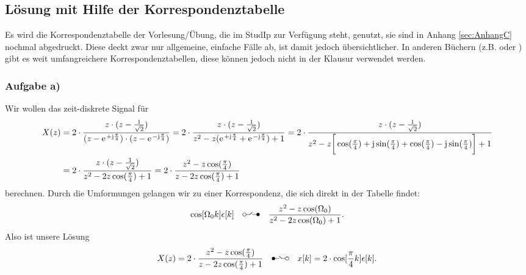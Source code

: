 \documentclass[11pt,a4paper,DIV=12]{scrartcl}
\renewcommand{\ztransf}{\mbox{\setlength{\unitlength}{0.1em}%
                            \begin{picture}(20,10)%
                              \put(2,3){\circle{4}}%
                              \put(4,3){\line(1,0){4.75}}%
                              \multiput(8.625,3.15)(0.25,0.25){11}{%
                                \makebox(0,0){\rmfamily\tiny .}}%
                              \put(17,3){\line(-1,0){5.75}}%
                              \put(18,3){\circle*{4}}%
                            \end{picture}%
                           }
                      }
\renewcommand{\Ztransf}{\mbox{\setlength{\unitlength}{0.1em}%
                            \begin{picture}(20,10)%
                              \put(2,3){\circle*{4}}%
                              \put(3,3){\line(1,0){5.75}}%
                              \multiput(11.375,3.15)(-0.25,0.25){11}{%
                                \makebox(0,0){\rmfamily\tiny .}}%
                              \put(16,3){\line(-1,0){4.75}}%
                              \put(18,3){\circle{4}}%
                            \end{picture}%
                           }
                      }
\begin{document}
\subsection{Lösung mit Hilfe der Korrespondenztabelle}
Es wird die Korrespondenztabelle der Vorlesung/Übung, die im StudIp zur Verfügung steht, genutzt, sie sind in Anhang \ref{sec:AnhangC} nochmal abgedruckt. Diese deckt zwar nur allgemeine, einfache Fälle ab, ist damit jedoch übersichtlicher. In anderen Büchern (z.B. \cite[Kap. 21, S. 1128-1130]{Bronstein2015} oder \cite[S. 237-238]{UlrichWeber2017} ) gibt es weit umfangreichere Korrespondenztabellen, diese können jedoch nicht in der Klausur verwendet werden.
\subsubsection{Aufgabe a)}
Wir wollen das zeit-diskrete Signal für
\begin{align}
	X(z)&=2\cdot\frac{z\cdot(z-\frac{1}{\sqrt{2}})}{(z-\e^{+\im\frac{\pi}{4}})\cdot(z-\e^{-\im\frac{\pi}{4}})}=2\cdot\frac{z\cdot(z-\frac{1}{\sqrt{2}})}{z^2-z(\e^{+\im\frac{\pi}{4}}+\e^{-\im\frac{\pi}{4}})+1}=2\cdot\frac{z\cdot(z-\frac{1}{\sqrt{2}})}{z^2-z\bigg[\cos(\frac{\pi}{4})+\im\sin(\frac{\pi}{4})+\cos(\frac{\pi}{4})-\im\sin(\frac{\pi}{4})\bigg ]+1}\nonumber\\
	&=2\cdot\frac{z\cdot(z-\frac{1}{\sqrt{2}})}{z^2-2z\cos(\frac{\pi}{4})+1}=2\cdot\frac{z^2-z\cos(\frac{\pi}{4})}{z-2z\cos(\frac{\pi}{4})+1}
\end{align}
berechnen.
Durch die Umformungen gelangen wir zu einer Korrespondenz, die sich direkt in der Tabelle findet:
\begin{align}
	\cos[\Omega_0k]\epsilon[k]\quad\ztransf\quad\frac{z^2-z\cos(\Omega_0)}{z^2-2z\cos(\Omega_0)+1}.
\end{align}
Also ist unsere Lösung
\begin{align}
	X(z)=2\cdot\frac{z^2-z\cos(\frac{\pi}{4})}{z-2z\cos(\frac{\pi}{4})+1}\quad\Ztransf\quad x[k]=2\cdot\cos[\frac{\pi}{4}k]\epsilon[k].
\end{align}
\end{document}
